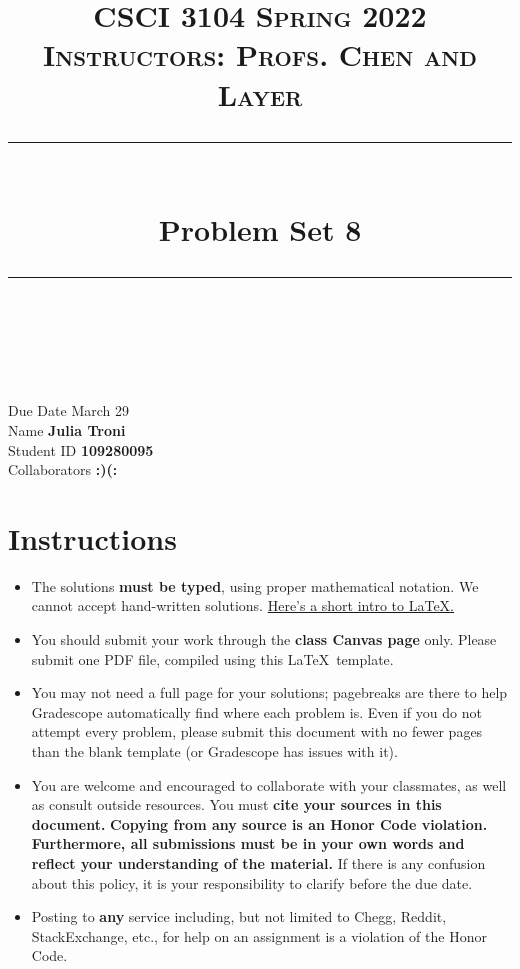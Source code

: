 \documentclass[11pt]{article}
\title{
\normalfont \normalsize 
\textsc{CSCI 3104 Spring 2022 \\ 
Instructors: Profs. Chen and Layer} \\
[10pt] 
\rule{\linewidth}{0.5pt} \\[6pt] 
\huge Problem Set 8 \\
\rule{\linewidth}{2pt}  \\[10pt]
}
\date{}
\theoremstyle{definition}
\theoremstyle{definition}
\theoremstyle{definition}
\begin{document}
\maketitle


\noindent
Due Date \dotfill March 29 \\
Name \dotfill \textbf{Julia Troni} \\
Student ID \dotfill \textbf{109280095} \\
Collaborators \dotfill \textbf{:)(:}

\tableofcontents

\section{Instructions}
 \begin{itemize}
	\item The solutions \textbf{must be typed}, using proper mathematical notation. We cannot accept hand-written solutions. \href{http://ece.uprm.edu/~caceros/latex/introduction.pdf}{Here's a short intro to \LaTeX.}
	\item You should submit your work through the \textbf{class Canvas page} only. Please submit one PDF file, compiled using this \LaTeX \ template.
	\item You may not need a full page for your solutions; pagebreaks are there to help Gradescope automatically find where each problem is. Even if you do not attempt every problem, please submit this document with no fewer pages than the blank template (or Gradescope has issues with it).

	\item You are welcome and encouraged to collaborate with your classmates, as well as consult outside resources. You must \textbf{cite your sources in this document.} \textbf{Copying from any source is an Honor Code violation. Furthermore, all submissions must be in your own words and reflect your understanding of the material.} If there is any confusion about this policy, it is your responsibility to clarify before the due date. 

	\item Posting to \textbf{any} service including, but not limited to Chegg, Reddit, StackExchange, etc., for help on an assignment is a violation of the Honor Code.
\end{itemize}
\end{document}
